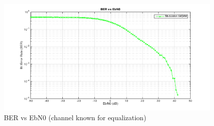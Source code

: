 \documentclass[a4paper]{article}
\begin{document}
    \begin{figure}
		\centering
		\includegraphics[scale=0.5]{figures/ber_ebno_awgn_only.png}
		\vspace{-0.2cm}
		\centering
		\caption{BER vs EbN0 (channel known for equalization)}
		\label{fig:ber_awgn_only}
	\end{figure}
 
	\vspace*{+5mm}
	
\end{document}

